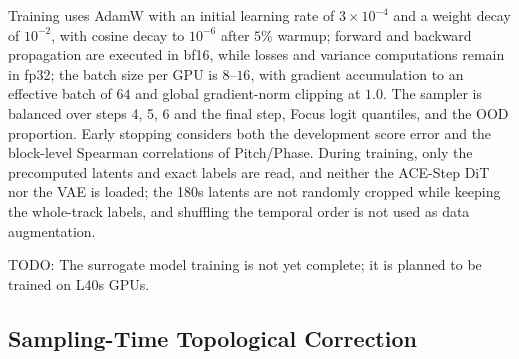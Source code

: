 \documentclass{article}
\begin{document}
Training uses AdamW with an initial learning rate of $3\times10^{-4}$ and a weight decay of $10^{-2}$, with cosine decay to $10^{-6}$ after $5\%$ warmup; forward and backward propagation are executed in bf16, while losses and variance computations remain in fp32; the batch size per GPU is $8$--$16$, with gradient accumulation to an effective batch of $64$ and global gradient-norm clipping at $1.0$. The sampler is balanced over steps 4, 5, 6 and the final step, Focus logit quantiles, and the OOD proportion. Early stopping considers both the development score error and the block-level Spearman correlations of Pitch/Phase. During training, only the precomputed latents and exact labels are read, and neither the ACE-Step DiT nor the VAE is loaded; the 180s latents are not randomly cropped while keeping the whole-track labels, and shuffling the temporal order is not used as data augmentation.

\begin{tcolorbox}[colback=yellow!30,colframe=yellow!60,boxrule=0.5pt,arc=6pt,left=6pt,right=6pt,top=4pt,bottom=4pt]
TODO: The surrogate model training is not yet complete; it is planned to be trained on L40s GPUs.
\end{tcolorbox}

\subsection{Sampling-Time Topological Correction}
\end{document}
